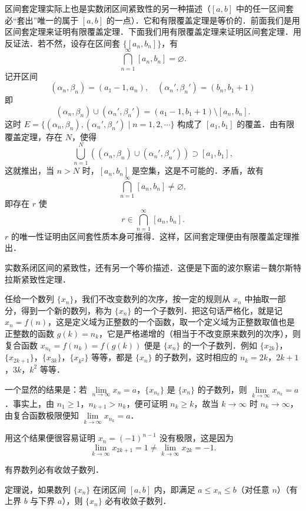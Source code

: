区间套定理实际上也是实数闭区间紧致性的另一种描述（$[a, b]$ 中的任一区间套必“套出”唯一的属于 $[a, b]$ 的一点）．它和有限覆盖定理是等价的．前面我们是用区间套定理来证明有限覆盖定理．下面我们用有限覆盖定理来证明区间套定理．用反证法．若不然，设存在区间套 $\{[a_n, b_n]\}$，有
\[
\bigcap_{n=1}^{\infty} [a_n, b_n] = \varnothing.
\]
记开区间
\[
(\alpha_n, \beta_n) = (a_1 - 1, a_n), \quad ({\alpha_n}', \beta_n') = (b_n, b_1 + 1)
\]
即
\[
(\alpha_n, \beta_n) \cup ({\alpha_n}', \beta_n') = (a_1 - 1, b_1 + 1) \setminus [a_n, b_n].
\]
这时 $E = \{(\alpha_n, \beta_n), ({\alpha_n}', \beta_n') \mid n = 1, 2, \cdots\}$ 构成了 $[a_1, b_1]$ 的覆盖．由有限覆盖定理，存在 $N$，使得
\[
\bigcup_{n=1}^{N} \left( (\alpha_n, \beta_n) \cup ({\alpha_n}', \beta_n') \right) \supset [a_1, b_1],
\]
这就推出，当 $n > N$ 时，$[a_n, b_n]$ 是空集，这是不可能的．矛盾，故有
\[
\bigcap_{n=1}^{\infty} [a_n, b_n] \neq \varnothing,
\]
即存在 $r$ 使
\[
r \in \bigcap_{n=1}^{\infty} [a_n, b_n].
\]
$r$ 的唯一性证明由区间套性质本身可推得．这样，区间套定理便由有限覆盖定理推出．

实数系闭区间的紧致性，还有另一个等价描述．这便是下面的波尔察诺－魏尔斯特拉斯紧致性定理．

任给一个数列 $\{x_n\}$，我们不改变数列的次序，按一定的规则从 $x_n$ 中抽取一部分，得到一个新的数列，称为 $\{x_n\}$ 的一个子数列．把这句话严格化，就是记 $x_n = f(n)$，这是定义域为正整数的一个函数，取一个定义域为正整数取值也是正整数的函数 $g(k) = n_k$，它是严格递增的（相当于不改变原来数列的次序），则复合函数 $x_{n_k} = f(n_k) = f(g(k))$ 便是 $\{x_n\}$ 的一个子数列．例如 $\{x_{2k}\}$，$\{x_{2k+1}\}$，$\{x_{3k}\}$，$\{x_{k^2}\}$ 等等，都是 $\{x_n\}$ 的子数列，这时相应的 $n_k = 2k$，$2k+1$，$3k$，$k^2$ 等等．

一个显然的结果是：若 $\lim\limits_{n \to \infty} x_n = a$，$\{x_{n_k}\}$ 是 $\{x_n\}$ 的子数列，则 $\lim\limits_{k \to \infty} x_{n_k} = a$．事实上，由 $n_1 \geqslant 1$，$n_{k+1} > n_k$，便可证明 $n_k \geqslant k$，故当 $k \to \infty$ 时 $n_k \to \infty$，由复合函数极限便知 $\lim\limits_{k \to \infty} x_{n_k} = a$．

用这个结果便很容易证明 $x_n = (-1)^{n-1}$ 没有极限，这是因为
\[
\lim_{k \to \infty} x_{2k+1} = 1 \neq \lim_{k \to \infty} x_{2k} = -1.
\]

\begin{theorem}\label{thm:9.3}
有界数列必有收敛子数列．
\end{theorem}

定理说，如果数列 $\{x_n\}$ 在闭区间 $[a, b]$ 内，即满足 $a \leqslant x_n \leqslant b$（对任意 $n$）（有上界 $b$ 与下界 $a$），则 $\{x_n\}$ 必有收敛子数列．

